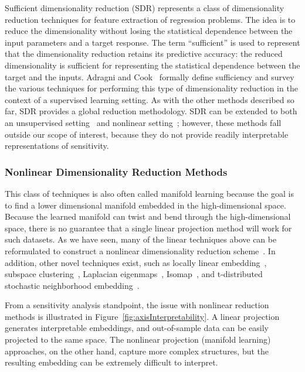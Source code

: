 Sufficient dimensionality reduction (SDR) represents a class of dimensionality reduction techniques for feature extraction of regression problems.
%
The idea is to reduce the dimensionality without losing the statistical dependence between the input parameters and a target response.
%
The term ``sufficient'' is used to represent that the dimensionality reduction retains its predictive accuracy: the reduced dimensionality is sufficient for representing the statistical dependence between the target and the inputs.
%
Adragni and Cook~\cite{AdragniCook2009} formally define sufficiency and survey the various techniques for performing this type of dimensionality reduction in the context of a supervised learning setting.
%
As with the other methods described so far, SDR provides a global reduction methodology.
%
SDR can be extended to both an unsupervised setting~\cite{WangShaJordan2010} and nonlinear setting~\cite{FukumizuBachJordan2004,FukumizuBachJordan2009,NilssonShaJordan2007}; however, these methods fall outside our scope of interest, because they do not provide readily interpretable representations of sensitivity.

\subsubsection{Nonlinear Dimensionality Reduction Methods}
\label{sec:nonlinearDR}

This class of techniques is also often called manifold learning because the goal is to find a lower dimensional manifold embedded in the high-dimensional space.
%
Because the learned manifold can twist and bend through the high-dimensional space, there is no guarantee that a single linear projection method will work for such datasets.
%
As we have seen, many of the linear techniques above can be reformulated to construct a nonlinear dimensionality reduction scheme~\cite{ScholkopfSmolaMuller1997,CollinsDasguptaSchapire2001,MohamedGhahramaniHeller2009,HyvarinenKarhunenOja2001,MikaRatschWeston1999,McLachlan2004,FukumizuBachJordan2004,FukumizuBachJordan2009,NilssonShaJordan2007}.
%
In addition, other novel techniques exist, such as locally linear embedding~\cite{RoweisSaul2000}, subspace clustering~\cite{Parsons2004}, Laplacian eigenmaps~\cite{BelkinNiyogi2003}, Isomap~\cite{TenenbaumSilvaLangford2000}, and t-distributed stochastic neighborhood embedding~\cite{MaatenHinton2008}.

From a sensitivity analysis standpoint, the issue with nonlinear reduction methods is illustrated in Figure~\ref{fig:axisInterpretability}.
%
A linear projection generates interpretable embeddings, and out-of-sample data can be easily projected to the same space.
%
The nonlinear projection (manifold learning) approaches, on the other hand, capture more complex structures, but the resulting embedding can be extremely difficult to interpret.
%

